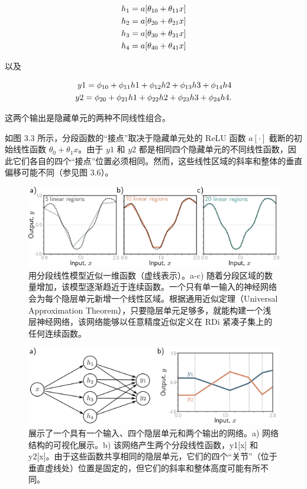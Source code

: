 \begin{align}
	h_1 = a[\theta_{10} + \theta_{11}x] \notag \\
	h_2 = a[\theta_{20} + \theta_{21}x] \notag \\
	h_3 = a[\theta_{30} + \theta_{31}x] \notag \\
	h_4 = a[\theta_{40} + \theta_{41}x]  
\end{align} 

以及

\begin{align}
	y1 = \phi_{10} + \phi_{11}h1 + \phi_{12}h2 + \phi_{13}h3 + \phi_{14}h4 \notag \\
	y2 = \phi_{20} + \phi_{21}h1 + \phi_{22}h2 + \phi_{23}h3 + \phi_{24}h4. 
\end{align} 


这两个输出是隐藏单元的两种不同线性组合。

如图 3.3 所示，分段函数的“接点”取决于隐藏单元处的 ReLU 函数 \(a[\cdot]\) 截断的初始线性函数 \(\theta_0 + \theta_1x\)。由于 \(y1\) 和 \(y2\) 都是相同四个隐藏单元的不同线性函数，因此它们各自的四个“接点”位置必须相同。然而，这些线性区域的斜率和整体的垂直偏移可能不同（参见图 3.6）。

\begin{figure}[ht!]
	\centering
	\includegraphics[width=0.7\linewidth]{png/chapter3/ShallowApproximate.png}
\caption{用分段线性模型近似一维函数（虚线表示）。a-c) 随着分段区域的数量增加，该模型逐渐趋近于连续函数。一个只有单一输入的神经网络会为每个隐层单元新增一个线性区域。根据通用近似定理（Universal Approximation Theorem），只要隐层单元足够多，就能构建一个浅层神经网络，该网络能够以任意精度近似定义在 RDi 紧凑子集上的任何连续函数。}
\end{figure}

\begin{figure}[ht!]
	\centering
	\includegraphics[width=0.7\linewidth]{png/chapter3/ShallowNetTwoOutputs.png}
\caption{展示了一个具有一个输入、四个隐层单元和两个输出的网络。a) 网络结构的可视化展示。b) 该网络产生两个分段线性函数，y1[x] 和 y2[x]。由于这些函数共享相同的隐层单元，它们的四个“关节”（位于垂直虚线处）位置是固定的，但它们的斜率和整体高度可能有所不同。}
\end{figure}

